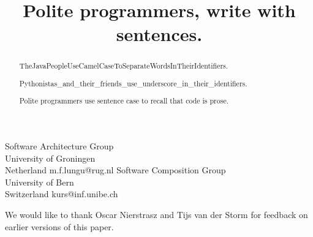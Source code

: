 \documentclass[preprint]{sigplanconf}
\begin{document}
\setlength{\pdfpageheight}{\paperheight}
\setlength{\pdfpagewidth}{\paperwidth}




\title{Polite programmers, write with sentences.}

           {Software Architecture Group\\
           University of Groningen\\
           Netherland}
           {m.f.lungu@rug.nl}
           {Software Composition Group\\
           University of Bern\\
           Switzerland}
           {kurs@inf.unibe.ch}

\maketitle

\begin{abstract}

\noindent
TheJavaPeopleUseCamelCaseToSeparateWordsInTheirIdentifiers. 

\noindent
Pythonistas\_and\_their\_friends\_use\_underscore\_in\_their\_identifiers. 

\noindent
Polite programmers use sentence case to recall that code is prose.
\end{abstract}
\vspace {1cm}







\acks

We would like to thank Oscar Nierstrasz and Tijs van der Storm for feedback on earlier versions of this paper.










\end{document}
